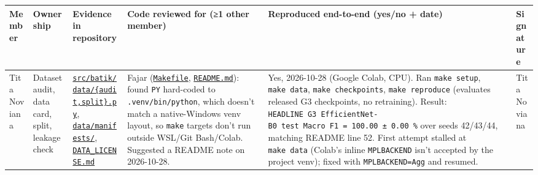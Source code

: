\documentclass[10pt,a4paper]{article}
\newcounter{none} %
\begin{document}
{\def\LTcaptype{none} %
\begin{longtable}[]{@{}
  >{\raggedright\arraybackslash}p{}
  >{\raggedright\arraybackslash}p{}
  >{\raggedright\arraybackslash}p{}
  >{\raggedright\arraybackslash}p{}
  >{\raggedright\arraybackslash}p{}
  >{\raggedright\arraybackslash}p{}@{}}
\toprule\noalign{}
\begin{minipage}[b]{\linewidth}\raggedright
Member
\end{minipage} & \begin{minipage}[b]{\linewidth}\raggedright
Ownership
\end{minipage} & \begin{minipage}[b]{\linewidth}\raggedright
Evidence in repository
\end{minipage} & \begin{minipage}[b]{\linewidth}\raggedright
Code reviewed for (≥1 other member)
\end{minipage} & \begin{minipage}[b]{\linewidth}\raggedright
Reproduced end-to-end (yes/no + date)
\end{minipage} & \begin{minipage}[b]{\linewidth}\raggedright
Signature
\end{minipage} \\
\midrule\noalign{}
\endhead
\bottomrule\noalign{}
\endlastfoot
Tita Noviana & Dataset audit, data card, split, leakage check & \href{https://github.com/Universitas-Cakrawala/semarang-batik-fine-grained-transfer-learning/tree/main/src/batik/data}{\texttt{src/\allowbreak{}batik/\allowbreak{}data/\allowbreak{}\{audit,\allowbreak{}split\}.py}}, \href{https://github.com/Universitas-Cakrawala/semarang-batik-fine-grained-transfer-learning/tree/main/data/manifests}{\texttt{data/\allowbreak{}manifests/\allowbreak{}}}, \href{https://github.com/Universitas-Cakrawala/semarang-batik-fine-grained-transfer-learning/blob/main/DATA_LICENSE.md}{\texttt{DATA\_\allowbreak{}LICENSE.md}} & Fajar (\href{https://github.com/Universitas-Cakrawala/semarang-batik-fine-grained-transfer-learning/blob/main/Makefile}{\texttt{Makefile}}, \href{https://github.com/Universitas-Cakrawala/semarang-batik-fine-grained-transfer-learning/blob/main/README.md}{\texttt{README.md}}): found \texttt{PY} hard-coded to \texttt{.venv/\allowbreak{}bin/\allowbreak{}python}, which doesn't match a native-Windows venv layout, so \texttt{make} targets don't run outside WSL/Git Bash/Colab. Suggested a README note on 2026-10-28. & Yes, 2026-10-28 (Google Colab, CPU). Ran \texttt{make\ setup}, \texttt{make\ data}, \texttt{make\ checkpoints}, \texttt{make\ reproduce} (evaluates released G3 checkpoints, no retraining). Result: \texttt{HEADLINE\ G3\ EfficientNet-B0\ test\ Macro\ F1\ =\ 100.00\ ±\ 0.00\ \%} over seeds 42/43/44, matching README line 52. First attempt stalled at \texttt{make\ data} (Colab's inline \texttt{MPLBACKEND} isn't accepted by the project venv); fixed with \texttt{MPLBACKEND=Agg} and resumed. & Tita Noviana \\

\end{longtable}}
\end{document}
